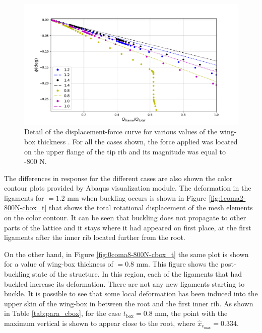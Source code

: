    \begin{figure}[!htpb] %
      \centering
      \includegraphics[width=0.8 \textwidth]{../figures/result-sim/cbox/force_displacement-close}
      \caption[Detail of the displacement-force curve for various values of the wing-box thickness]{Detail of the displacement-force curve for various values of the wing-box thickness \boxt. For all the cases shown, the force applied was located on the upper flange of the tip rib and its magnitude was equal to -800 N.}\label{fig:forceDisplacement-close-Cbox_t}
    \end{figure}

    The differences in response for the different cases are also shown the color contour plots provided by Abaqus visualization module. The deformation in the ligaments for \boxt$= 1.2$ mm when buckling occurs is shown in Figure \ref{fig:1coma2-800N-cbox_t} that shows the total rotational displacement of the mesh elements on the color contour. It can be seen that buckling does not propagate to other parts of the lattice and it stays where it had appeared on first place, at the first ligaments after the inner rib located further from the root.

    On the other hand, in Figure \ref{fig:0coma8-800N-cbox_t} the same plot is shown for a value of wing-box thickness of \boxt$= 0.8$ mm. This figure shows the post-buckling state of the structure. In this region, each of the ligaments that had buckled increase its deformation. There are not any new ligaments starting to buckle. It is possible to see that some local deformation has been induced into the upper skin of the wing-box in between the root and the first inner rib. As shown in Table \ref{tab:para_cbox}, for the case $t_{\mathrm{box}} = 0.8$ mm, the point with the maximum vertical is shown to appear close to the root, where $\hat{x}_{v_{\mathrm{max}}} = 0.334$.

